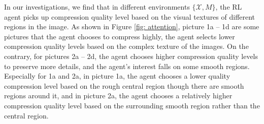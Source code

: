 In our investigations, we find that in different environments $ \{\mathcal{X}, M\} $, the RL agent picks up compression quality level based on the visual textures of different regions in the image. As shown in Figure \ref{fig: attention}, picture 1a -- 1d are some pictures that the agent chooses to compress highly, the agent selects lower compression quality levels based on the complex texture of the images. On the contrary, for pictures 2a -- 2d, the agent chooses higher compression quality levels to preserve more details, and the agent's interest falls on some smooth regions. Especially for 1a and 2a, in picture 1a, the agent chooses a lower quality compression level based on the rough central region though there are smooth regions around it, and in picture 2a, the agent chooses a relatively higher compression quality level based on the surrounding smooth region rather than the central region. %
